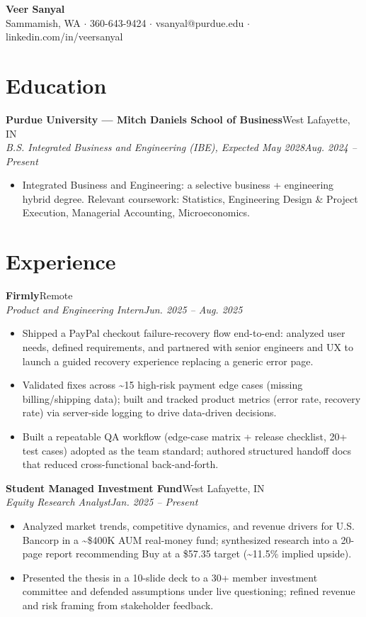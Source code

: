 \documentclass[10pt,letterpaper]{article}
\newcommand{\entry}[4]{%
  \textbf{#1}\hfill #2\\[1pt]
  \textit{#3}\hfill \textit{#4}\\[2pt]
}
\begin{document}
\begin{center}
  {\LARGE \textbf{Veer Sanyal}}\\[3pt]
  Sammamish, WA $\cdot$ 360-643-9424 $\cdot$ vsanyal@purdue.edu $\cdot$ linkedin.com/in/veersanyal
\end{center}

\section*{Education}
\textbf{Purdue University --- Mitch Daniels School of Business}\hfill West Lafayette, IN\\[1pt]
\textit{B.S. Integrated Business and Engineering (IBE), Expected May 2028}\hfill \textit{Aug. 2024 -- Present}
\begin{itemize}
  \item Integrated Business and Engineering: a selective business + engineering hybrid degree. Relevant coursework: Statistics, Engineering Design \& Project Execution, Managerial Accounting, Microeconomics.
\end{itemize}

\section*{Experience}
\entry{Firmly}{Remote}{Product and Engineering Intern}{Jun. 2025 -- Aug. 2025}
\begin{itemize}
  \item Shipped a PayPal checkout failure-recovery flow end-to-end: analyzed user needs, defined requirements, and partnered with senior engineers and UX to launch a guided recovery experience replacing a generic error page.
  \item Validated fixes across \textasciitilde15 high-risk payment edge cases (missing billing/shipping data); built and tracked product metrics (error rate, recovery rate) via server-side logging to drive data-driven decisions.
  \item Built a repeatable QA workflow (edge-case matrix + release checklist, 20+ test cases) adopted as the team standard; authored structured handoff docs that reduced cross-functional back-and-forth.
\end{itemize}

\entry{Student Managed Investment Fund}{West Lafayette, IN}{Equity Research Analyst}{Jan. 2025 -- Present}
\begin{itemize}
  \item Analyzed market trends, competitive dynamics, and revenue drivers for U.S. Bancorp in a \textasciitilde\$400K AUM real-money fund; synthesized research into a 20-page report recommending Buy at a \$57.35 target (\textasciitilde11.5\% implied upside).
  \item Presented the thesis in a 10-slide deck to a 30+ member investment committee and defended assumptions under live questioning; refined revenue and risk framing from stakeholder feedback.
\end{itemize}
\end{document}
